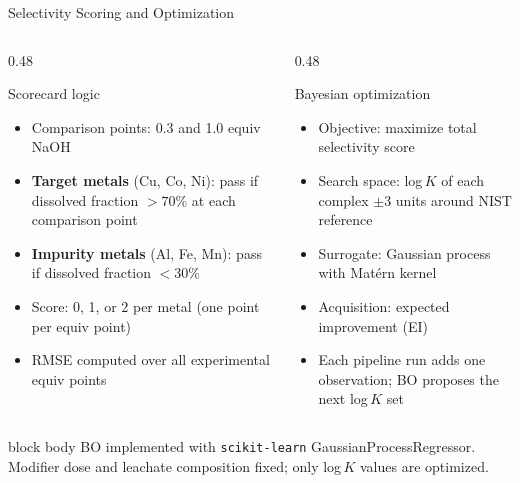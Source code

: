\documentclass[8pt,aspectratio=169]{beamer}
\begin{document}
\begin{frame}{Selectivity Scoring and Optimization}
  \begin{columns}[T]
    \begin{column}{0.48\textwidth}
      \begin{block}{Scorecard logic}
        \begin{itemize}
          \setlength{\itemsep}{4pt}
          \item Comparison points: 0.3 and 1.0 equiv NaOH
          \item \textbf{Target metals} (Cu, Co, Ni): pass if dissolved
                fraction $> 70\%$ at each comparison point
          \item \textbf{Impurity metals} (Al, Fe, Mn): pass if dissolved
                fraction $< 30\%$
          \item Score: 0, 1, or 2 per metal (one point per equiv point)
          \item RMSE computed over all experimental equiv points
        \end{itemize}
      \end{block}
    \end{column}
    \begin{column}{0.48\textwidth}
      \begin{block}{Bayesian optimization}
        \begin{itemize}
          \setlength{\itemsep}{4pt}
          \item Objective: maximize total selectivity score
          \item Search space: log$\,K$ of each complex $\pm 3$ units
                around NIST reference
          \item Surrogate: Gaussian process with Mat\'{e}rn kernel
          \item Acquisition: expected improvement (EI)
          \item Each pipeline run adds one observation; BO proposes
                the next log$\,K$ set
        \end{itemize}
      \end{block}
    \end{column}
  \end{columns}
  \vspace{4pt}
  \begin{beamercolorbox}[rounded=true, shadow=false, wd=\textwidth]{block body}
    \tiny
    BO implemented with \texttt{scikit-learn} GaussianProcessRegressor. Modifier dose and leachate composition fixed; only log$\,K$ values are optimized.
  \end{beamercolorbox}
\end{frame}
\end{document}
